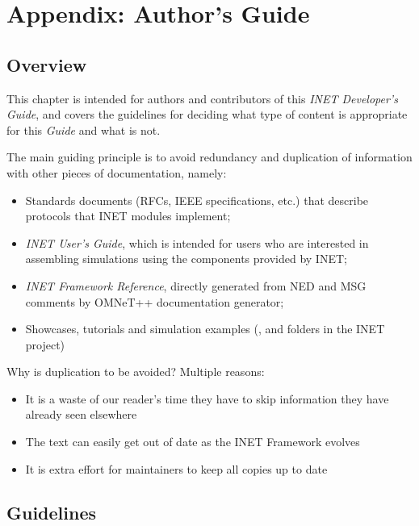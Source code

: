 \chapter{Appendix: Author's Guide}
\label{cha:authors-guide}


\section{Overview}
\label{sec:authorsguide:overview}

This chapter is intended for authors and contributors of this 
\textit{INET Developer's Guide}, and covers the guidelines for deciding
what type of content is appropriate for this \textit{Guide} and 
what is not.

The main guiding principle is to avoid redundancy and duplication
of information with other pieces of documentation, namely:

\begin{itemize}
  \item Standards documents (RFCs, IEEE specifications, etc.) that
    describe protocols that INET modules implement;
  \item \textit{INET User's Guide}, which is intended for users who
    are interested in assembling simulations using the components
    provided by INET;
  \item \textit{INET Framework Reference}, directly generated from 
    NED and MSG comments by OMNeT++ documentation generator;
  \item Showcases, tutorials and simulation examples (,
     and  folders in the INET project)
\end{itemize}

Why is duplication to be avoided? Multiple reasons:

\begin{itemize}
  \item It is a waste of our reader's time they have to skip information
     they have already seen elsewhere
  \item The text can easily get out of date as the INET Framework evolves
  \item It is extra effort for maintainers to keep all copies up to date  
\end{itemize}


\section{Guidelines}
\label{sec:authorsguide:guidelines}

